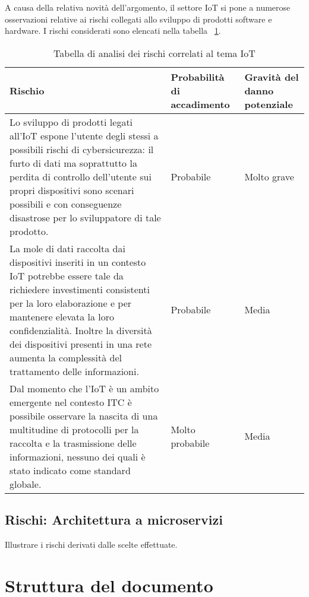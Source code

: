 A causa della relativa novità dell'argomento, il settore IoT si pone a numerose osservazioni relative ai rischi collegati allo sviluppo di prodotti software e hardware. I rischi considerati sono elencati nella tabella ~\ref{tab:rischi-iot}.
\begin{table}
\caption{Tabella di analisi dei rischi correlati al tema IoT}
\label{tab:rischi-iot}
\begin{tabularx}{\linewidth}{|p{7.5cm}|X|X|}
\hline
\textbf{Rischio} & \textbf{Probabilità di accadimento} & \textbf{Gravità del danno potenziale}\\
\hline
Lo sviluppo di prodotti legati all'IoT espone l'utente degli stessi a possibili rischi di cybersicurezza: il furto di dati ma soprattutto la perdita di controllo dell'utente sui propri dispositivi sono scenari possibili e con conseguenze disastrose per lo sviluppatore di tale prodotto. & Probabile & Molto grave \\
\hline
La mole di dati raccolta dai dispositivi inseriti in un contesto IoT potrebbe essere tale da richiedere investimenti consistenti per la loro elaborazione e per mantenere elevata la loro confidenzialità. Inoltre la diversità dei dispositivi presenti in una rete aumenta la complessità del trattamento delle informazioni. & Probabile & Media \\
\hline
Dal momento che l'IoT è un ambito emergente nel contesto ITC è possibile osservare la nascita di una multitudine di protocolli per la raccolta e la trasmissione delle informazioni, nessuno dei quali è stato indicato come standard globale. & Molto probabile & Media \\
\hline
\end{tabularx}
\end{table}


\subsection{Rischi: Architettura a microservizi}



Illustrare i rischi derivati dalle scelte effettuate.

\section{Struttura del documento}

